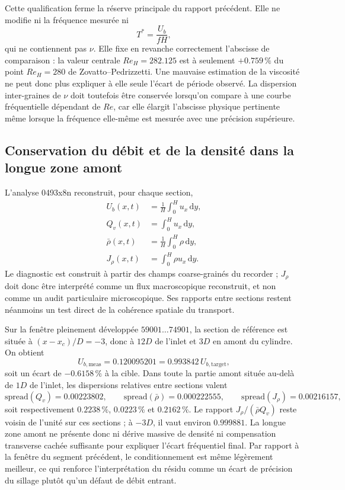 \documentclass[11pt,a4paper]{article}
\begin{document}
Cette qualification ferme la réserve principale du rapport précédent. Elle ne modifie ni la fréquence mesurée ni
\begin{equation}
  T^*=\frac{U_b}{fH},
\end{equation}
qui ne contiennent pas $\nu$. Elle fixe en revanche correctement l'abscisse de comparaison : la valeur centrale $Re_H=282.125$ est à seulement $+0.759\,\%$ du point $Re_H=280$ de Zovatto--Pedrizzetti. Une mauvaise estimation de la viscosité ne peut donc plus expliquer à elle seule l'écart de période observé. La dispersion inter-graines de $\nu$ doit toutefois être conservée lorsqu'on compare à une courbe fréquentielle dépendant de $Re$, car elle élargit l'abscisse physique pertinente même lorsque la fréquence elle-même est mesurée avec une précision supérieure.

\subsection{Conservation du débit et de la densité dans la longue zone amont}

L'analyse 0493x8n reconstruit, pour chaque section,
\begin{align}
 U_b(x,t) &= \frac{1}{H}\int_0^H u_x\,\mathrm dy,\\
 Q_v(x,t) &= \int_0^H u_x\,\mathrm dy,\\
 \bar\rho(x,t) &= \frac{1}{H}\int_0^H \rho\,\mathrm dy,\\
 J_\rho(x,t) &= \int_0^H \rho u_x\,\mathrm dy.
\end{align}
Le diagnostic est construit à partir des champs coarse-grainés du recorder ; $J_\rho$ doit donc être interprété comme un flux macroscopique reconstruit, et non comme un audit particulaire microscopique. Ses rapports entre sections restent néanmoins un test direct de la cohérence spatiale du transport.

Sur la fenêtre pleinement développée $59001\ldots74901$, la section de référence est située à $(x-x_c)/D=-3$, donc à $12D$ de l'inlet et $3D$ en amont du cylindre. On obtient
\begin{equation}
 U_{b,\mathrm{meas}}=0.120095201
       =0.993842\,U_{b,\mathrm{target}},
\end{equation}
soit un écart de $-0.6158\,\%$ à la cible. Dans toute la partie amont située au-delà de $1D$ de l'inlet, les dispersions relatives entre sections valent
\begin{equation}
 \mathrm{spread}(Q_v)=0.00223802,\qquad
 \mathrm{spread}(\bar\rho)=0.000222555,\qquad
 \mathrm{spread}(J_\rho)=0.00216157,
 \label{eq:x8-flux-spreads}
\end{equation}
soit respectivement $0.2238\,\%$, $0.0223\,\%$ et $0.2162\,\%$. Le rapport $J_\rho/(\bar\rho Q_v)$ reste voisin de l'unité sur ces sections ; à $-3D$, il vaut environ $0.999881$. La longue zone amont ne présente donc ni dérive massive de densité ni compensation transverse cachée suffisante pour expliquer l'écart fréquentiel final. Par rapport à la fenêtre du segment précédent, le conditionnement est même légèrement meilleur, ce qui renforce l'interprétation du résidu comme un écart de précision du sillage plutôt qu'un défaut de débit entrant.
\end{document}
